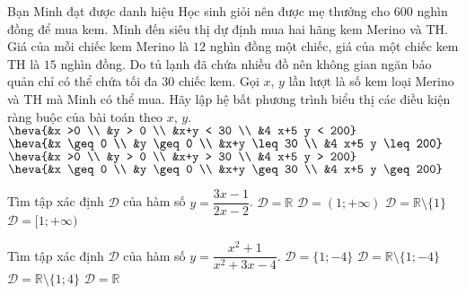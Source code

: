 \begin{ex}%
Bạn Minh đạt được danh hiệu Học sinh giỏi nên được mẹ thưởng cho $600$ nghìn đồng để mua kem. Minh đến siêu thị dự định mua hai hãng kem Merino và TH. Giá của mỗi chiếc kem Merino là $12$ nghìn đồng một chiếc, giá của một chiếc kem TH là $15$ nghìn đồng. Do tủ lạnh đã chứa nhiều đồ nên không gian ngăn bảo quản chỉ có thể chứa tối đa $30$ chiếc kem. Gọi $x$, $y$ lần lượt là số kem loại Merino và TH mà Minh có thể mua. Hãy lập hệ bất phương trình biểu thị các điều kiện ràng buộc của bài toán theo $x$, $y$.
\choice
{$\heva{&x >0 \\ &y > 0 \\ &x+y < 30 \\ &4 x+5 y < 200}$}
{\True $\heva{&x \geq 0 \\ &y \geq 0 \\ &x+y \leq 30 \\ &4 x+5 y \leq 200}$}
{$\heva{&x >0 \\ &y > 0 \\ &x+y > 30 \\ &4 x+5 y > 200}$}
{$\heva{&x \geq 0 \\ &y \geq 0 \\ &x+y \geq 30 \\ &4 x+5 y \geq 200}$}
\end{ex}
\begin{ex}%
	Tìm tập xác định $\mathscr{D}$ của hàm số $y=\dfrac{3x-1}{2x-2}$.
	\choice
	{$\mathscr{D}=\mathbb{R}$}
	{$\mathscr{D}=(1;+\infty)$}
	{\True $\mathscr{D}=\mathbb{R}\setminus\{1\}$}
	{$\mathscr{D}=[1;+\infty)$}
\end{ex}
\begin{ex}%
	Tìm tập xác định $\mathscr{D}$ của hàm số $y=\dfrac{x^2+1}{x^2+3x-4}$.
	\choice
	{$\mathscr{D}=\{1;-4\}$}
	{\True $\mathscr{D}=\mathbb{R}\setminus\{1;-4\}$}
	{$\mathscr{D}=\mathbb{R}\setminus\{1;4\}$}
	{$\mathscr{D}=\mathbb{R}$}
\end{ex}
